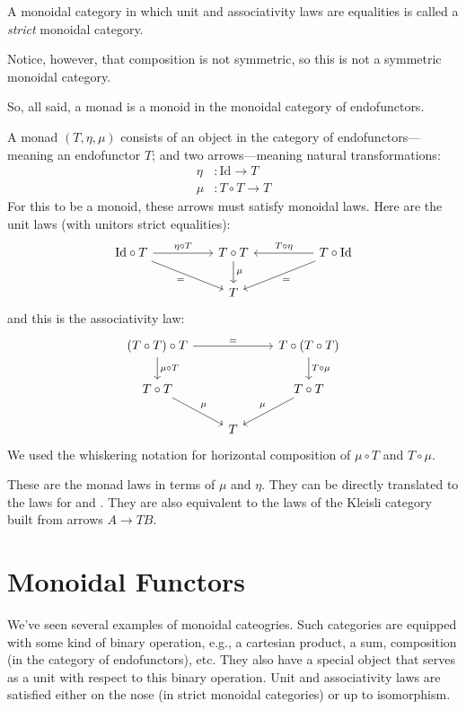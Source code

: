 \documentclass[DaoFP]{subfiles}
\begin{document}
A monoidal category in which unit and associativity laws are equalities is called a \emph{strict} monoidal category.

Notice, however, that composition is not symmetric, so this is not a symmetric monoidal category.

So, all said, a monad is a monoid in the monoidal category of endofunctors. 

A monad $(T, \eta, \mu)$ consists of an object in the category of endofunctors---meaning an endofunctor $T$; and two arrows---meaning natural transformations:
\begin{align*}
 \eta &\colon \text{Id} \to T \\
 \mu &\colon T \circ T \to T 
\end{align*}
For this to be a monoid, these arrows must satisfy monoidal laws. Here are the unit laws (with unitors strict equalities):
\[
 \begin{tikzcd}
\text{Id} \circ T
 \arrow[rr, "\eta \circ T"]
 \arrow[rrd, "="']
& & T \circ T
 \arrow[d, "\mu"]
&& T \circ \text{Id}
 \arrow[ll, "T \circ \eta"']
 \arrow[lld, "="]
 \\
 && T
  \end{tikzcd}
\]
and this is the associativity law:
\[
 \begin{tikzcd}
 (T \circ T) \circ T 
 \arrow[rr, "="]
 \arrow[d, "\mu \circ T"]
 &&
 T \circ (T \circ T)
 \arrow[d, "T \circ \mu"]
 \\
 T \circ T 
 \arrow[dr, "\mu"]
& & T \circ T
 \arrow[dl, "\mu"']
 \\
&  T
 \end{tikzcd}
\]
We used the whiskering notation for horizontal composition of $\mu \circ T$ and $T \circ \mu$.

These are the monad laws in terms of $\mu$ and $\eta$. They can be directly translated to the laws for  and . They are also equivalent to the laws of the Kleisli category built from arrows $A \to T B$.

\section{Monoidal Functors}

We've seen several examples of monoidal cateogries. Such categories are equipped with some kind of binary operation, e.g., a cartesian product, a sum, composition (in the category of endofunctors), etc. They also have a special object that serves as a unit with respect to this binary operation. Unit and associativity laws are satisfied either on the nose (in strict monoidal categories) or up to isomorphism.
\end{document}

